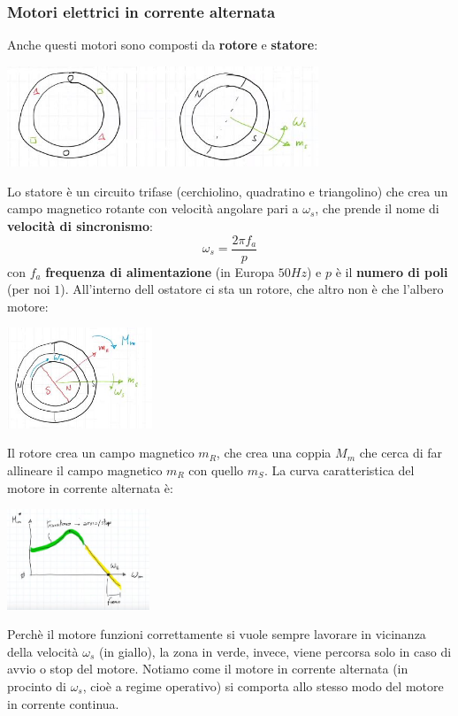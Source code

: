 \subsubsection{Motori elettrici in corrente alternata}
Anche questi motori sono composti da \textbf{rotore} e \textbf{statore}:
\begin{center}
    \includegraphics[height=3cm]{../lezione12/img6.JPG}
\end{center}
Lo statore è un circuito trifase (cerchiolino, quadratino e triangolino) che crea un campo magnetico rotante con velocità angolare pari a $\omega_s$, che prende il nome di \textbf{velocità di sincronismo}:
\[
    \omega_s = \frac{2 \pi f_a}{p}
\]
con $f_a$ \textbf{frequenza di alimentazione} (in Europa $50Hz$) e $p$ è il \textbf{numero di poli} (per noi $1$).\newline
\newline
All'interno dell ostatore ci sta un rotore, che altro non è che l'albero motore:
\begin{center}
    \includegraphics[height=3cm]{../lezione12/img7.JPG}
\end{center}
Il rotore crea un campo magnetico $m_R$, che crea una coppia $M_m$ che cerca di far allineare il campo magnetico $m_R$ con quello $m_S$.\newline
\newline
La curva caratteristica del motore in corrente alternata è:
\begin{center}
    \includegraphics[height=3cm]{../lezione12/img8.JPG}
\end{center}
Perchè il motore funzioni correttamente si vuole sempre lavorare in vicinanza della velocità $\omega_s$ (in giallo), la zona in verde, invece, viene percorsa solo in caso di avvio o stop del motore.\newline
\newline
Notiamo come il motore in corrente alternata (in procinto di $\omega_s$, cioè a regime operativo) si comporta allo stesso modo del motore in corrente continua.
